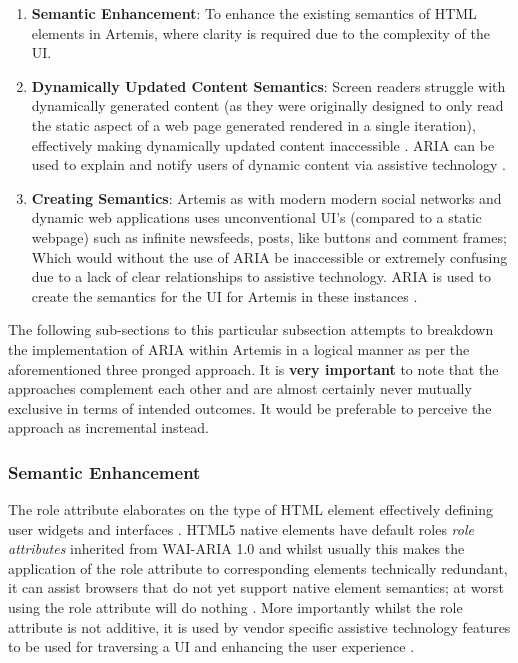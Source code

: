 \begin{enumerate}
    
    \item \textbf{Semantic Enhancement}: To enhance the existing semantics of HTML elements in Artemis, where clarity is required due to the complexity of the UI.
    
    \item \textbf{Dynamically Updated Content Semantics}: Screen readers struggle with dynamically generated content (as they were originally designed to only read the static aspect of a web page generated rendered in a single iteration), effectively making dynamically updated content inaccessible \cite{Sukardi2016,Mills,MozillaDeveloperNetwork}. ARIA can be used to explain and notify users of dynamic content via assistive technology \cite{Sukardi2016,MozillaDeveloperNetwork}.
    
    \item \textbf{Creating Semantics}: Artemis as with modern modern social networks and dynamic web applications uses unconventional UI's (compared to a static webpage) such as infinite newsfeeds, posts, like buttons and comment frames; Which would without the use of ARIA be inaccessible or extremely confusing due to a lack of clear relationships \cite{MozillaDeveloperNetwork,W3Ca,MozillaDeveloperNetworkb} to assistive technology. ARIA is used to create the semantics for the UI for Artemis in these instances .

\end{enumerate}

The following sub-section\textquotesingle s to this particular subsection attempts to breakdown the implementation of ARIA within Artemis in a logical manner as per the aforementioned three pronged approach. It is \textbf{very important} to note that the approaches complement each other and are almost certainly never mutually exclusive in terms of intended outcomes. It would be preferable to perceive the approach as incremental instead.

\subsubsection{Semantic Enhancement}

The role attribute elaborates on the type of HTML element \cite{MDN} effectively defining user widgets and interfaces \cite{W3C2014a}. HTML5 native elements have default roles \textit{role attributes} inherited from WAI-ARIA 1.0 and whilst usually this makes the application of the role attribute to corresponding elements technically redundant, it can assist browsers that do not yet support native element semantics; at worst using the role attribute will do nothing \cite{W3C2014,CraigJamesH}.  More importantly whilst the role attribute is not additive, it is used by vendor specific assistive technology features to be used for traversing a UI and enhancing the user experience \cite{W3C2014a,MozillaDeveloperNetworkc}.

